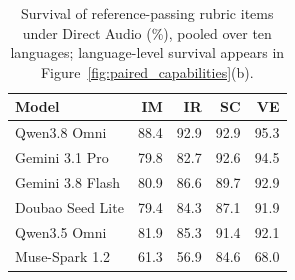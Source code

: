 \begin{table}[t]
\centering
\captionsetup{font=small,skip=5pt}
\caption{Survival of reference-passing rubric items under Direct Audio (\%), pooled over ten languages; language-level survival appears in Figure~\ref{fig:paired_capabilities}(b).}
\label{tab:survival_summary}
\small
\setlength{\tabcolsep}{2.5pt}
\renewcommand{\arraystretch}{1.12}
\begin{tabular}{@{}lrrrr@{}}
\toprule
\textbf{Model} & \textbf{IM} & \textbf{IR} & \textbf{SC} & \textbf{VE} \\
\midrule
Qwen3.8 Omni & 88.4 & 92.9 & 92.9 & 95.3 \\
Gemini 3.1 Pro & 79.8 & 82.7 & 92.6 & 94.5 \\
Gemini 3.8 Flash & 80.9 & 86.6 & 89.7 & 92.9 \\
Doubao Seed Lite & 79.4 & 84.3 & 87.1 & 91.9 \\
Qwen3.5 Omni & 81.9 & 85.3 & 91.4 & 92.1 \\
Muse-Spark 1.2 & 61.3 & 56.9 & 84.6 & 68.0 \\
\bottomrule
\end{tabular}
\end{table}
